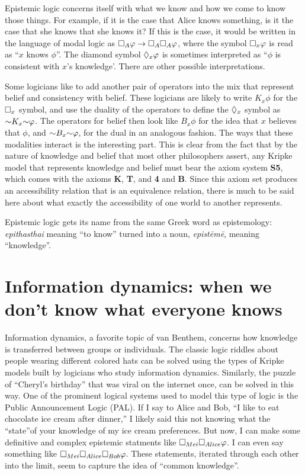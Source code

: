 Epistemic logic concerns itself with what we know and how we come to know those things. For example, if it is the case that Alice knows
something, is it the case that she knows that she knows it? If this is the case, it would be written in the language of modal logic as
$\square_A \varphi \rightarrow \square_A \square_A \varphi$, where the symbol $\square_x \varphi$ is read as ``$x$ knows $\phi$''. The diamond
symbol $\lozenge_x \varphi$ is sometimes interpreted as ``$\phi$ is consistent with $x$'s knowledge'. There are other possible interpretations.

Some logicians like to add another pair of operators into the mix that represent belief and consistency with belief. These logicians are likely
to write $K_x \phi$ for the $\square_x$ symbol, and use the duality of the operators to define the $\lozenge_x$ symbol as $\mathord{\sim} K_x
\mathord{\sim} \varphi$. The operators for belief then look like $B_x \phi$ for the idea that $x$ believes that $\phi$, and $\mathord{\sim} B_x \mathord{\sim} \varphi$,
for the dual in an analogous fashion. The ways that these modalities interact is the interesting part. This is clear from the fact that
by the nature of knowledge and belief that most other philosophers assert, any Kripke model that represents knowledge and belief must bear the
axiom system \textbf{S5}, which comes with the axioms \textbf{K}, \textbf{T}, and \textbf{4} and \textbf{B}. Since this axiom set produces an
accessibility relation that is an equivalence relation, there is much to be said here about what exactly the accessibility of one world to another
represents. 

Epistemic logic gets its name from the same Greek word as epistemology: \emph{epithasthai} meaning ``to know'' turned into a noun, \emph{epist\=em\=e},
meaning ``knowledge''.

\section{Information dynamics: when we don't know what everyone knows}

Information dynamics, a favorite topic of van Benthem, concerns how knowledge is transferred between groups or individuals. The classic logic
riddles about people wearing different colored hats can be solved using the types of Kripke models built by logicians who study information
dynamics. Similarly, the puzzle of ``Cheryl's birthday'' that was viral on the internet once, can be solved in this way. One of the prominent
logical systems used to model this type of logic is the Public Announcement Logic (PAL). If I say to Alice and Bob, ``I like to eat chocolate
ice cream after dinner,'' I likely said this not knowing what the ``state''of your knowledge of my ice cream preferences. But now, I can make some
definitive and complex epistemic statments like $\square_{Mei} \square_{Alice} \varphi$. I can even say something like $\square_{Mei} \square_{Alice}
\square_{Bob} \varphi$. These statements, iterated through each other into the limit, seem to capture the idea of ``common knowledge''. 

